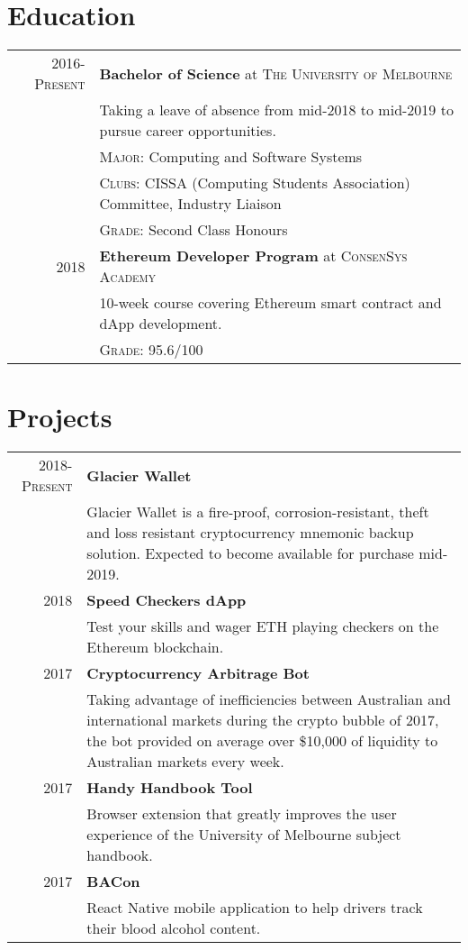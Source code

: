 \documentclass[a4paper,10pt]{article}
\begin{document}
\section{Education}
\begin{tabular}{rl}	
    \textsc{2016-Present} & \textbf{Bachelor of Science} at \textsc{The University of Melbourne}\\
    & Taking a leave of absence from mid-2018 to mid-2019 to pursue career opportunities.\\
    & \textsc{Major:} Computing and Software Systems\\
    & \textsc{Clubs:} CISSA (Computing Students Association) Committee, Industry Liaison\\
    & \textsc{Grade:} Second Class Honours\\
    \textsc{2018} & \textbf{Ethereum Developer Program} at \textsc{ConsenSys Academy}\\
    & 10-week course covering Ethereum smart contract and dApp development.\\
    & \textsc{Grade:} 95.6/100
\end{tabular}
\section{Projects}
\begin{tabular}{rp{13.5cm}}	
    \textsc{2018-Present} & \textbf{Glacier Wallet}\\
    & Glacier Wallet is a fire-proof, corrosion-resistant, theft and loss resistant cryptocurrency mnemonic backup solution. Expected to become available for purchase mid-2019.\\
    \textsc{2018} & \textbf{Speed Checkers dApp}\\
    & Test your skills and wager ETH playing checkers on the Ethereum blockchain.\\
    \textsc{2017} & \textbf{Cryptocurrency Arbitrage Bot}\\
    & Taking advantage of inefficiencies between Australian and international markets during the crypto bubble of 2017, the bot provided on average over \$10,000 of liquidity to Australian markets every week.\\
    2017 & \textbf{Handy Handbook Tool}\\
    & Browser extension that greatly improves the user experience of the University of Melbourne subject handbook.\\
    \textsc{2017} & \textbf{BACon}\\
    & React Native mobile application to help drivers track their blood alcohol content.
\end{tabular}
\end{document}
